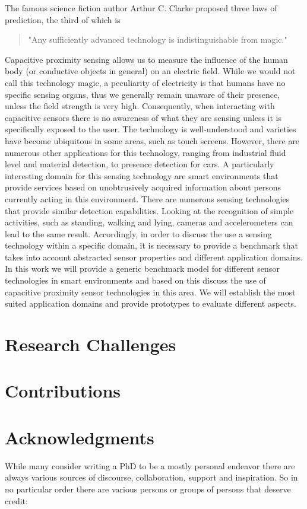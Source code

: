 The famous science fiction author Arthur C. Clarke proposed three laws of prediction, the  third of which is 
\begin{quote}
"Any sufficiently advanced technology is indistinguishable from magic." \cite{clarke1962hazards} 
\end{quote}
Capacitive proximity sensing allows us to measure the influence of the human body (or conductive objects in general) on an electric field. While we would not call this technology magic, a peculiarity of electricity is that humans have no specific sensing organs, thus we generally remain unaware of their presence, unless the field strength is very high. Consequently, when interacting with capacitive sensors there is no awareness of what they are sensing unless it is specifically exposed to the user. The technology is well-understood and varieties have become ubiquitous in some areas, such as touch screens. However, there are numerous other applications for this technology, ranging from industrial fluid level and material detection, to presence detection for cars. A particularly interesting domain for this sensing technology are smart environments that provide services based on unobtrusively acquired information about persons currently acting in this environment. There are numerous sensing technologies that provide similar detection capabilities. Looking at the recognition of simple activities, such as standing, walking and lying, cameras and accelerometers can lead to the same result. Accordingly, in order to discuss the use a sensing technology within a specific domain, it is necessary to provide a benchmark that takes into account abstracted sensor properties and different application domains. In this work we will provide a generic benchmark model for different sensor technologies in smart environments and based on this discuss the use of capacitive proximity sensor technologies in this area. We will establish the most suited application domains and provide prototypes to evaluate different aspects.
\section{Research Challenges}
\section{Contributions}
\section{Acknowledgments}
While many consider writing a PhD to be a mostly personal endeavor there are always various sources of discourse, collaboration, support and inspiration. 
So in no particular order there are various persons or groups of persons that deserve credit: 